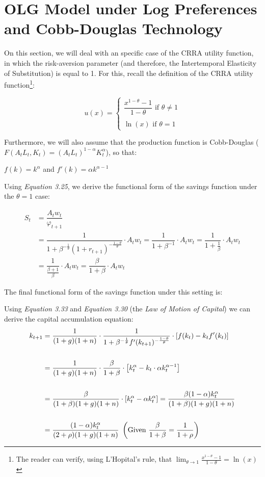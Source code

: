 \section{OLG Model under Log Preferences and Cobb-Douglas Technology}

On this section, we will deal with an specific case of the CRRA utility function, in which the risk-aversion parameter (and therefore, the Intertemporal Elasticity of Substitution) is equal to 1. For this, recall the definition of the CRRA utility function\footnote{The reader can verify, using L'Hopital's rule, that $\lim_{\theta\to 1} \frac{x^{1-\theta}-1}{1-\theta}=\ln(x)$ }:

$$
u(x)=\begin{cases}
\dfrac{x^{1-\theta}-1}{1-\theta} \text{ if } \theta\neq 1\\
\\
\ln(x) \text{ if } \theta=1
\end{cases}
$$

\bigskip
Furthermore, we will also assume that the production function is Cobb-Douglas ($F(A_tL_t,K_t)=(A_tL_t)^{1-\alpha}K_t^\alpha$), so that:
\begin{center}
$f(k)=k^\alpha$ and $f'(k)=\alpha k^{\alpha-1}$
\end{center}

Using \textit{Equation 3.25}, we derive the functional form of the savings function under the $\theta=1$ case:

\begin{align*}
S_t &= \dfrac{A_tw_t}{\varphi_{t+1}}\\
&= \dfrac{1}{1+\beta^{-\frac{1}{\theta}}(1+r_{t+1})^{-\frac{1-\theta}{\theta}}} \cdot A_tw_t = \dfrac{1}{1+\beta^{-1}}\cdot A_tw_t = \dfrac{1}{1+\frac{1}{\beta}}\cdot A_tw_t\\
&= \dfrac{1}{\frac{\beta+1}{\beta}}\cdot A_tw_t = \dfrac{\beta}{1+\beta} \cdot A_tw_t
\end{align*}

\bigskip
The final functional form of the savings function under this setting is:

Using \textit{Equation 3.33} and \textit{Equation 3.30} (the \textit{Law of Motion of Capital}) we can derive the capital accumulation equation:
\begin{align*}
k_{t+1} &= \dfrac{1}{(1+g)(1+n)} \cdot \dfrac{1}{1+\beta^{-\frac{1}{\theta}}f'(k_{t+1})^{-\frac{1-\theta}{\theta}}} \cdot \left[ f(k_t)-k_tf'(k_t) \right] \\
\\
&= \dfrac{1}{(1+g)(1+n)}\cdot \dfrac{\beta}{1+\beta}\cdot \left[ k_t^\alpha - k_t\cdot \alpha k_t^{\alpha-1} \right] \\
\\
&= \dfrac{\beta}{(1+\beta)(1+g)(1+n)}\cdot \left[ k_t^\alpha - \alpha k_t^\alpha \right] = \dfrac{\beta(1-\alpha)k_t^\alpha}{(1+\beta)(1+g)(1+n)} \\
\\
&= \dfrac{(1-\alpha)k_t^\alpha}{(2+\rho)(1+g)(1+n)} \text{      } \left( \text{Given } \dfrac{\beta}{1+\beta}=\dfrac{1}{1+\rho} \right)
\end{align*}

